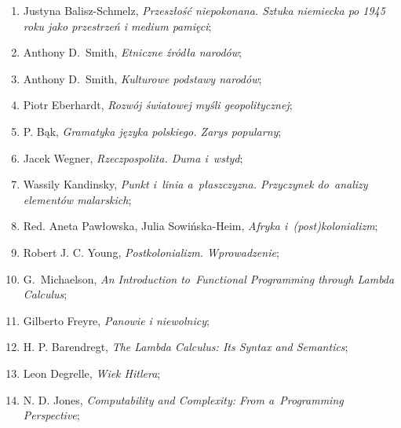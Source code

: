 \documentclass[a4paper,11pt]{article}
\begin{document}
\begin{enumerate}
\item Justyna Balisz-Schmelz, \textit{Przeszłość niepokonana. Sztuka
    niemiecka po 1945 roku jako przestrzeń i medium pamięci};



\item Anthony D.~Smith, \textit{Etniczne źródła narodów};



\item Anthony D.~Smith, \textit{Kulturowe podstawy narodów};



\item Piotr Eberhardt, \textit{Rozwój światowej myśli geopolitycznej};



\item P. Bąk, \textit{Gramatyka języka polskiego. Zarys popularny};



\item Jacek Wegner, \textit{Rzeczpospolita. Duma i~wstyd};



\item Wassily Kandinsky, \textit{Punkt i~linia a~płaszczyzna. Przyczynek
    do~analizy elementów malarskich};



\item Red. Aneta Pawłowska, Julia Sowińska-Heim, \textit{Afryka
    i~(post)kolonializm};



\item Robert J. C. Young, \textit{Postkolonializm. Wprowadzenie};



\item G.~Michaelson, \textit{An Introduction to~Functional Programming
    through Lambda Calculus};



\item Gilberto Freyre, \textit{Panowie i niewolnicy};



\item H. P. Barendregt, \textit{The Lambda Calculus: Its Syntax and
    Semantics};



\item Leon Degrelle, \textit{Wiek Hitlera};



\item N. D. Jones, \textit{Computability and Complexity: From
    a~Programming Perspective};




\end{enumerate}
\end{document}
